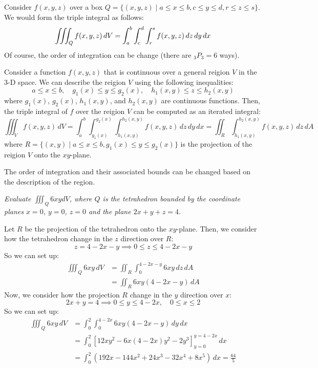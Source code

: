 \documentclass[11pt]{report}
\begin{document}
\begin{example}
    Consider $f(x,y,z)$ over a box $Q = \{(x,y,z) \mid a \le x \le b , c \le y \le d, r \le z \le s\}$. We would form the triple integral as follows:
    $$
        \iiint_Q f(x,y,z) \, dV = \int_a^b \int_c^d \int_r^s f(x,y,z) \, dz \, dy \, dx \\
    $$
    Of course, the order of integration can be change (there are $_3P_3= 6$ ways).
\end{example}

\begin{definition}
    Consider a function $f(x,y,z)$ that is continuous over a general reigion $V$ in the 3-D space. We can describe the reigion $V$ using the following inequalities:
    $$
        a \le x \le b, \quad g_1(x) \le y \le g_2(x), \quad h_1(x,y) \le z \le h_2(x,y)
    $$
    where $g_1(x)$, $g_2(x)$, $h_1(x,y)$, and $h_2(x,y)$ are continuous functions. Then, the triple integral of $f$ over the reigion $V$ can be computed as an iterated integral:
    \begin{equation}
        \iiint_V f(x,y,z) \, dV = \int_a^b \int_{g_1(x)}^{g_2(x)} \int_{h_1(x,y)}^{h_2(x,y)} f(x,y,z) \, dz \, dy \, dx = \iint_R \int_{h_1(x,y)}^{h_2(x,y)} f(x,y,z) \, dz \, dA
    \end{equation}
    where $R = \{(x,y) \mid a \le x \le b, g_1(x) \le y \le g_2(x)\}$ is the projection of the reigion $V$ onto the $xy$-plane.

    The order of integration and their associated bounds can be changed based on the description of the region.
\end{definition}

\begin{example} \label{ex:triple_integral_tetrahedron}
    \textit{Evaluate $\iiint_Q 6xy dV$, where $Q$ is the tetrahedron bounded by the coordinate planes $x=0$, $y=0$, $z=0$ and the plane $2x + y + z = 4$.}

    Let $R$ be the projection of the tetrahedron onto the $xy$-plane. Then, we consider how the tetrahedron change in the $z$ direction over $R$:
    $$
        z = 4 - 2x - y \implies 0 \le z \le 4 - 2x - y
    $$
    So we can set up:
    \begin{align*}
        \iiint_Q 6xy \, dV &= \iint_R \int_0^{4 - 2x - y} 6xy \, dz \, dA \\
        &= \iint_R 6xy(4 - 2x - y) \, dA
    \end{align*}
    Now, we consider how the projection $R$ change in the $y$ direction over $x$:
    $$
        2x + y = 4 \implies 0 \le y \le 4 - 2x, \quad 0 \le x \le 2
    $$
    So we can set up:
    \begin{align*}
        \iiint_Q 6xy \, dV &= \int_0^2 \int_0^{4 - 2x} 6xy(4 - 2x - y) \, dy \, dx \\
        &= \int_0^2 \left[ 12x y^2 - 6x(4 - 2x) y^2 - 2y^3 \right]_{y=0}^{y=4 - 2x} \, dx \\
        &= \int_0^2 (192x - 144x^2 + 24x^3 - 32x^4 + 8x^5) \, dx = \frac{64}{5}
    \end{align*}
\end{example}
\end{document}
